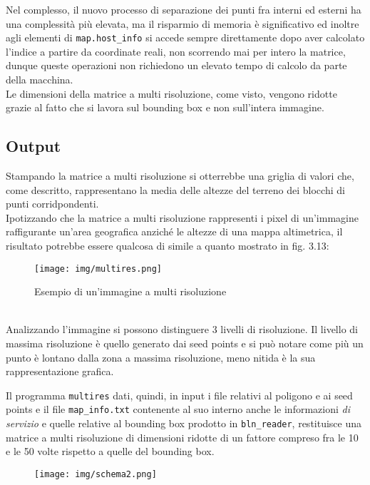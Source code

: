 			Nel complesso, il nuovo processo di separazione dei punti fra interni ed esterni ha una complessit\`{a} pi\`{u} elevata, ma il risparmio di memoria \`{e} significativo ed inoltre agli elementi di \texttt{map.host\_info} si accede sempre direttamente dopo aver calcolato l'indice a partire da coordinate reali, non scorrendo mai per intero la matrice, dunque queste operazioni non richiedono un elevato tempo di calcolo da parte della macchina.\\
			Le dimensioni della matrice a multi risoluzione, come visto, vengono ridotte grazie al fatto che si lavora sul bounding box e non sull'intera immagine. 

		\subsection{Output}
			Stampando la matrice a multi risoluzione si otterrebbe una griglia di valori che, come descritto, rappresentano la media delle altezze del terreno dei blocchi di punti corridpondenti.\\
			Ipotizzando che la matrice a multi risoluzione rappresenti i pixel di un'immagine raffigurante un'area geografica anzich\'{e} le altezze di una mappa altimetrica, il risultato potrebbe essere qualcosa di simile a quanto mostrato in fig. 3.13:
			\begin{figure}[htbp]
				\centering
				\texttt{[image: img/multires.png]}
				\caption{Esempio di un'immagine a multi risoluzione}
			\end{figure}\\
			Analizzando l'immagine si possono distinguere 3 livelli di risoluzione. Il livello di massima risoluzione \`{e} quello generato dai seed points e si pu\`{o} notare come pi\`{u} un punto \`{e} lontano dalla zona a massima risoluzione, meno nitida \`{e} la sua rappresentazione grafica.

			Il programma \texttt{multires} dati, quindi, in input i file relativi al poligono e ai seed points e il file \texttt{map\_info.txt} contenente al suo interno anche le informazioni \textit{di servizio} e quelle relative al bounding box prodotto in \texttt{bln\_reader}, restituisce una matrice a multi risoluzione di dimensioni ridotte di un fattore compreso fra le 10 e le 50 volte rispetto a quelle del bounding box.
			\begin{figure}[htbp]
				\centering
				\texttt{[image: img/schema2.png]}
			\end{figure}